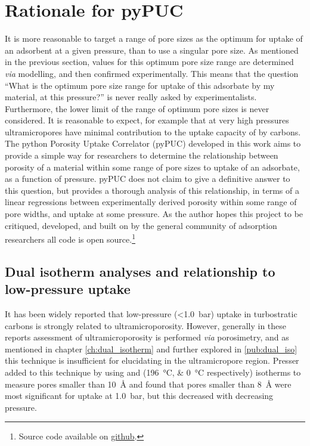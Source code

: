 \newpage
\section{Rationale for pyPUC}
It is more reasonable to target a range of pore sizes as the optimum for uptake of an \gls{adsorbent} at a given pressure, than to use a singular pore size. As mentioned in the previous section, values for this optimum pore size range are determined \textit{via} modelling, and then confirmed experimentally.\citep{Biloe2002Optimal, Cabria2007optimum, Hlushak2018Heat, Choi2019Unique, Presser2011Effect} This means that the question ``What is the optimum pore size range for uptake of this \gls{adsorbate} by my material, at this pressure?'' is never really asked by experimentalists. Furthermore, the lower limit of the range of optimum pore sizes is never considered. It is reasonable to expect, for example that at very high pressures \glspl{ultramicropore} have minimal contribution to the uptake capacity of  by carbons. The python Porosity Uptake Correlator (pyPUC) developed in this work aims to provide a simple way for researchers to determine the relationship between porosity of a material within some range of pore sizes to uptake of an \gls{adsorbate}, as a function of pressure. pyPUC does not claim to give a definitive answer to this question, but provides a thorough analysis of this relationship, in terms of a linear regressions between experimentally derived porosity within some range of pore widths, and uptake at some pressure. As the author hopes this project to be critiqued, developed, and built on by the general community of \gls{adsorption} researchers all code is open source.\footnote{Source code available on \href{https://github.com/sblanky/pyPUC}{github}.}

\subsection[]{\texorpdfstring{Dual isotherm analyses and relationship to low-pressure  uptake}{Dual isotherm analyses and relationship to low-pressure CO2 uptake}}
It has been widely reported that low-pressure (\qty{<1.0}{\bar})  uptake in \glspl{turbostratic carbon} is strongly related to ultramicroporosity.\citep{Presser2011Effect, Sevilla2013Assessment, Adeniran2016Is, Wickramaratne2013Importance} However, generally in these reports assessment of ultramicroporosity is performed \textit{via}  porosimetry, and as mentioned in chapter \ref{ch:dual_isotherm} and further explored in \ref{pub:dual_iso} this technique is insufficient for elucidating  in the \gls{ultramicropore} region.\citep{Jagiello2008Characterization, Jagiello2019Enhanced, Jagiello2020Exploiting} Presser added to this technique by using  and  (\qtylist[list-units=single]{196;0}{\degreeCelsius} respectively) isotherms to measure pores smaller than \qty{10}{\angstrom} and found that pores smaller than \qty{8}{\angstrom} were most significant for  uptake at \qty{1.0}{\bar}, but this decreased with decreasing pressure.\citep{Presser2011Effect}

